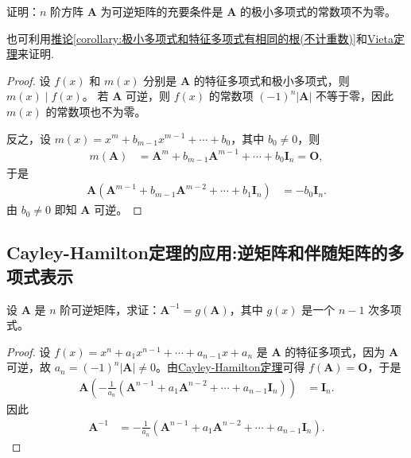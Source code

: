 \documentclass[../../main.tex]{subfiles}
\begin{document}
\begin{proposition}\label{proposition:矩阵可逆充要条件极小多项式常数项非零}
证明：\(n\) 阶方阵 \(\boldsymbol{A}\) 为可逆矩阵的充要条件是 \(\boldsymbol{A}\) 的极小多项式的常数项不为零。
\end{proposition}
\begin{note}
也可利用\hyperref[corollary:极小多项式和特征多项式有相同的根(不计重数)]{推论\ref{corollary:极小多项式和特征多项式有相同的根(不计重数)}}和\hyperref[theorem:Vieta定理]{Vieta定理}来证明.
\end{note}
\begin{proof}
设 \(f(x)\) 和 \(m(x)\) 分别是 \(\boldsymbol{A}\) 的特征多项式和极小多项式，则 \(m(x)\mid f(x)\)。
若 \(\boldsymbol{A}\) 可逆，则 \(f(x)\) 的常数项 \((-1)^n|\boldsymbol{A}|\) 不等于零，因此 \(m(x)\) 的常数项也不为零。

反之，设 \(m(x)=x^m + b_{m - 1}x^{m - 1}+\cdots + b_0\)，其中 \(b_0\neq 0\)，则
\begin{align*}
m(\boldsymbol{A})&=\boldsymbol{A}^m + b_{m - 1}\boldsymbol{A}^{m - 1}+\cdots + b_0\boldsymbol{I}_n=\boldsymbol{O},
\end{align*}
于是
\begin{align*}
\boldsymbol{A}(\boldsymbol{A}^{m - 1}+b_{m - 1}\boldsymbol{A}^{m - 2}+\cdots + b_1\boldsymbol{I}_n)&=-b_0\boldsymbol{I}_n.
\end{align*}
由 \(b_0\neq 0\) 即知 \(\boldsymbol{A}\) 可逆。
\end{proof}

\subsection{Cayley-Hamilton定理的应用:逆矩阵和伴随矩阵的多项式表示}

\begin{proposition}\label{proposition:矩阵的逆可以用其多项式表示}
设 \(\boldsymbol{A}\) 是 \(n\) 阶可逆矩阵，求证：\(\boldsymbol{A}^{-1}=g(\boldsymbol{A})\)，其中 \(g(x)\) 是一个 \(n - 1\) 次多项式。
\end{proposition}
\begin{proof}
设 \(f(x)=x^n + a_1x^{n - 1}+\cdots + a_{n - 1}x + a_n\) 是 \(\boldsymbol{A}\) 的特征多项式，因为 \(\boldsymbol{A}\) 可逆，故 \(a_n = (-1)^n|\boldsymbol{A}|\neq 0\)。由\hyperref[theorem:Cayley-Hamilton定理]{Cayley-Hamilton定理}可得 \(f(\boldsymbol{A})=\boldsymbol{O}\)，于是
\begin{align*}
\boldsymbol{A}\left(-\frac{1}{a_n}(\boldsymbol{A}^{n - 1}+a_1\boldsymbol{A}^{n - 2}+\cdots + a_{n - 1}\boldsymbol{I}_n)\right)&=\boldsymbol{I}_n.
\end{align*}
因此
\begin{align*}
\boldsymbol{A}^{-1}&=-\frac{1}{a_n}(\boldsymbol{A}^{n - 1}+a_1\boldsymbol{A}^{n - 2}+\cdots + a_{n - 1}\boldsymbol{I}_n).
\end{align*} 
\end{proof}
\end{document}
